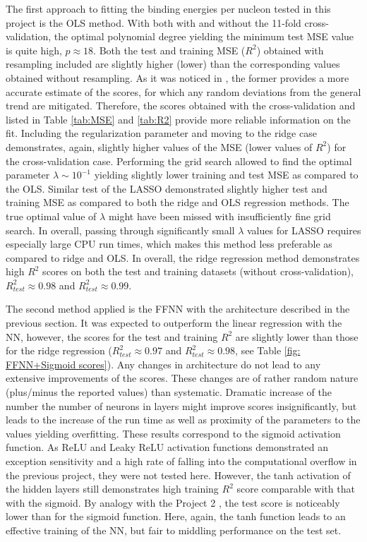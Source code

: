 \documentclass[numberedappendix, twocolappendix]{emulateapj}
\begin{document}
The first approach to fitting the binding energies per nucleon tested in this project is the OLS method. With both with and without the 11-fold cross-validation, the optimal polynomial degree yielding the minimum test MSE value is quite high, $p\approx 18$. Both the test and training MSE ($R^2$) obtained with resampling included are slightly higher (lower) than the corresponding values obtained without resampling. As it was noticed in \cite{proj1_1,proj1_2, proj2}, the former provides a more accurate estimate of the scores, for which any random deviations from the general trend are mitigated. Therefore, the scores obtained with the cross-validation and listed in Table \ref{tab:MSE} and \ref{tab:R2} provide more reliable information on the fit. Including the regularization parameter and moving to the ridge case demonstrates, again, slightly higher values of the MSE (lower values of $R^2$) for the cross-validation case. Performing the grid search allowed to find the optimal parameter $\lambda\sim10^{-1}$ yielding slightly lower training and test MSE as compared to the OLS. Similar test of the LASSO demonstrated slightly higher test and training MSE as compared to both the ridge and OLS regression methods. The true optimal value of $\lambda$ might have been missed with insufficiently fine grid search. In overall, passing through significantly small $\lambda$ values for LASSO requires especially large CPU run times, which makes this method less preferable as compared to ridge and OLS. In overall, the ridge regression method demonstrates high $R^2$ scores on both the test and training datasets (without cross-validation), $R^2_{test}\approx 0.98$ and $R^2_{test}\approx 0.99$.

The second method applied is the FFNN with the architecture described in the previous section. It was expected to outperform the linear regression with the NN, however, the scores for the test and training $R^2$ are slightly lower than those for the ridge regression ($R^2_{test}\approx 0.97$ and $R^2_{test}\approx 0.98$, see Table \ref{fig: FFNN+Sigmoid scores}). Any changes in architecture do not lead to any extensive improvements of the scores. These changes are of rather random nature (plus/minus the reported values) than systematic. Dramatic increase of the number the number of neurons in layers might improve scores insignificantly, but leads to the increase of the run time as well as proximity of the parameters to the values yielding overfitting. These results correspond to the sigmoid activation function. As ReLU and Leaky ReLU activation functions demonstrated an exception sensitivity and a high rate of falling into the computational overflow in the previous project, they were not tested here. However, the tanh activation of the hidden layers still demonstrates high training $R^2$ score comparable with that with the sigmoid. By analogy with the Project 2 \cite{proj2}, the test score is noticeably lower than for the sigmoid function. Here, again, the tanh function leads to an effective training of the NN, but fair to middling performance on the test set. 
\end{document}
